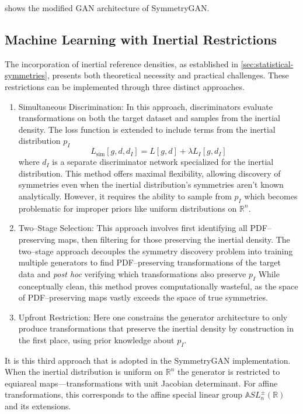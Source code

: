      shows the modified GAN architecture of SymmetryGAN.
    
    \subsection{Machine Learning with Inertial Restrictions}
    The incorporation of inertial reference densities, as established in \cref{sec:statistical-symmetries}, presents both theoretical necessity and practical challenges.
    These restrictions can be implemented through three distinct approaches.
    \begin{enumerate}
        \item Simultaneous Discrimination:
            In this approach, discriminators evaluate transformations on both the target dataset and samples from the inertial density.
            The loss function is extended to include terms from the inertial distribution \(p_I\)
            \[
                L_{\text{sim}}[g,d,d_I] = L[g,d] + \lambda L_I[g,d_I]
            \]
            where \(d_I\) is a separate discriminator network specialized for the inertial distribution.
            This method offers maximal flexibility, allowing discovery of symmetries even when the inertial distribution's symmetries aren't known analytically.
            However, it requires the ability to sample from \(p_I\) which becomes problematic for improper priors like uniform distributions on \(\mathbb{R}^n\).
        \item Two--Stage Selection:
            This approach involves first identifying all PDF--preserving maps, then filtering for those preserving the inertial density.
            The two--stage approach decouples the symmetry discovery problem into training multiple generators to find PDF--preserving transformations of the target data and \textit{post hoc} verifying which transformations also preserve \(p_I\)
            While conceptually clean, this method proves computationally wasteful, as the space of PDF--preserving maps vastly exceeds the space of true symmetries.
        \item Upfront Restriction:
            Here one constrains the generator architecture to only produce transformations that preserve the inertial density by construction in the first place, using prior knowledge about \(p_I\).
    \end{enumerate}
    It is this third approach that is adopted in the SymmetryGAN implementation.
    When the inertial distribution is uniform on \(\mathbb{R}^n\) the generator is restricted to equiareal maps---transformations with unit Jacobian determinant.
    For affine transformations, this corresponds to the affine special linear group \(\mathbb{A}SL^\pm_n(\mathbb{R})\) and its extensions.

